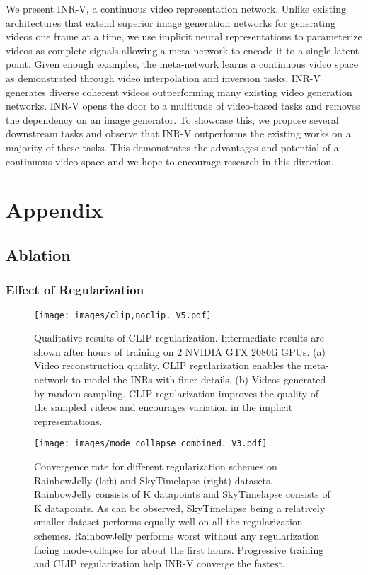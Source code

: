 \documentclass[10pt]{article} \usepackage[accepted]{tmlr}
\begin{document}
We present INR-V, a continuous video representation network.
Unlike existing architectures that extend superior image generation networks for generating videos one frame at a time, we use implicit neural representations to parameterize videos as complete signals allowing a meta-network to encode it to a single latent point. Given enough examples, the meta-network learns a continuous video space as demonstrated through video interpolation and inversion tasks. INR-V generates diverse coherent videos outperforming many existing video generation networks.
INR-V opens the door to a multitude of video-based tasks and removes the dependency on an image generator. 
To showcase this, we propose several downstream tasks and observe that INR-V outperforms the existing works on a majority of these tasks. This demonstrates the advantages and potential of a continuous video space and we hope to encourage research in this direction. 




\appendix
\section{Appendix}

\subsection{Ablation}

\subsubsection{Effect of Regularization}
\label{sec:ablation-appendix}

\begin{figure}[h]
  \centering
  \texttt{[image: images/clip,noclip.\_V5.pdf]}
  \caption{Qualitative results of CLIP regularization. Intermediate results are shown after  hours of training on 2 NVIDIA GTX 2080ti GPUs. (a) Video reconstruction quality. CLIP regularization enables the meta-network to model the INRs with finer details. (b) Videos generated by random sampling. CLIP regularization improves the quality of the sampled videos and encourages variation in the implicit representations.}
  \label{fig:clipnoclip}
\end{figure}

\begin{figure}[h!]
  \centering
  \texttt{[image: images/mode\_collapse\_combined.\_V3.pdf]}
  \caption {Convergence rate for different regularization schemes on RainbowJelly (left) and SkyTimelapse (right) datasets. RainbowJelly consists of K datapoints and SkyTimelapse consists of K datapoints. As can be observed, SkyTimelapse being a relatively smaller dataset performs equally well on all the regularization schemes. RainbowJelly performs worst without any regularization facing mode-collapse for about the first  hours. Progressive training and CLIP regularization help INR-V converge the fastest.}
  \label{fig:skyrainbowcompletegraph}
\end{figure}
\end{document}
